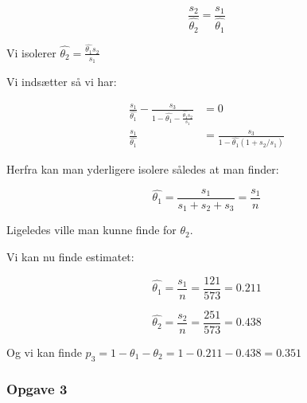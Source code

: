 \begin{equation}
    \frac{s_2}{ \hat{\theta_2}} = \frac{s_1}{\hat{\theta_1}}
\end{equation}



Vi isolerer $\hat{\theta_2} = \frac{\hat{\theta_1} s_2}{s_1}$

Vi indsætter så vi har:


\begin{align}
    \frac{s_1}{\hat{\theta_1}} - \frac{s_3}{1-\hat{\theta_1} - \frac{\hat{\theta_1} s_2}{s_1}} &= 0 \\
    \frac{s_1}{\hat{\theta_1}} &= \frac{s_3}{1-\hat{\theta_1}(1 + s_2/s_1)}
\end{align}

Herfra kan man yderligere isolere således at man finder:

\begin{equation}
    \hat{\theta_1} = \frac{s_1}{s_1 + s_2 + s_3} = \frac{s_1}{n}
\end{equation}

Ligeledes ville man kunne finde for $\theta_2$.

Vi kan nu finde estimatet:

\begin{equation}
    \hat{\theta_1} = \frac{s_1}{n} = \frac{121}{573} = 0.211
\end{equation}

\begin{equation}
    \hat{\theta_2} = \frac{s_2}{n} = \frac{251}{573} = 0.438
\end{equation}

Og vi kan finde $p_3 = 1 - \theta_1 -\theta_2 =1 - 0.211 - 0.438  =0.351$

\subsubsection{Opgave 3}
